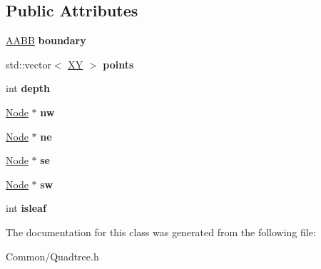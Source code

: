\subsection*{Public Attributes}
\begin{DoxyCompactItemize}
\item 
\hypertarget{classbali_1_1_node_a0b8361fa7e14f5ccd288fb0261f31b67}{\hyperlink{classbali_1_1_a_a_b_b}{A\-A\-B\-B} {\bfseries boundary}}\label{classbali_1_1_node_a0b8361fa7e14f5ccd288fb0261f31b67}

\item 
\hypertarget{classbali_1_1_node_ad339ed70295f287b12e779ee01240ae8}{std\-::vector$<$ \hyperlink{classbali_1_1_x_y}{X\-Y} $>$ {\bfseries points}}\label{classbali_1_1_node_ad339ed70295f287b12e779ee01240ae8}

\item 
\hypertarget{classbali_1_1_node_ac34cc4a88acac9e67ddc878964228494}{int {\bfseries depth}}\label{classbali_1_1_node_ac34cc4a88acac9e67ddc878964228494}

\item 
\hypertarget{classbali_1_1_node_a8d6aae2a52b3224b3cd013e351454a0e}{\hyperlink{classbali_1_1_node}{Node} $\ast$ {\bfseries nw}}\label{classbali_1_1_node_a8d6aae2a52b3224b3cd013e351454a0e}

\item 
\hypertarget{classbali_1_1_node_a2cdcbfb2c8a6de30b1f78cc7387d711d}{\hyperlink{classbali_1_1_node}{Node} $\ast$ {\bfseries ne}}\label{classbali_1_1_node_a2cdcbfb2c8a6de30b1f78cc7387d711d}

\item 
\hypertarget{classbali_1_1_node_a6a46e6329622964ac5f9a8a74ddc9b64}{\hyperlink{classbali_1_1_node}{Node} $\ast$ {\bfseries se}}\label{classbali_1_1_node_a6a46e6329622964ac5f9a8a74ddc9b64}

\item 
\hypertarget{classbali_1_1_node_a6857f70e35bfa7321c2421f8a485af01}{\hyperlink{classbali_1_1_node}{Node} $\ast$ {\bfseries sw}}\label{classbali_1_1_node_a6857f70e35bfa7321c2421f8a485af01}

\item 
\hypertarget{classbali_1_1_node_abce4c678a3165ddc2808f4564f6bf470}{int {\bfseries isleaf}}\label{classbali_1_1_node_abce4c678a3165ddc2808f4564f6bf470}

\end{DoxyCompactItemize}


The documentation for this class was generated from the following file\-:\begin{DoxyCompactItemize}
\item 
Common/Quadtree.\-h\end{DoxyCompactItemize}
